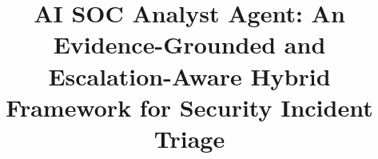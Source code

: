 \documentclass[conference]{IEEEtran}
\begin{document}
\title{AI SOC Analyst Agent: An Evidence-Grounded and Escalation-Aware Hybrid Framework for Security Incident Triage}



\maketitle










\end{document}
